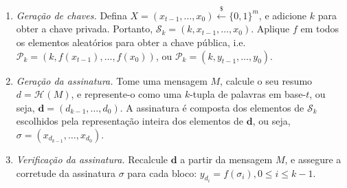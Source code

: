 \documentclass[12pt]{report}
\newcommand{\pk}{\mathcal{P}_k}
\newcommand{\sk}{\mathcal{S}_k}
\newcommand{\hash}[2][]{\mathcal{H}^{#1}(#2)}
\newcommand{\binwds}[1]{\{0, 1\}^{#1}}
\begin{document}
\begin{enumerate}

  \item[] \emph{Geração de chaves.} Defina $X = (x_{t - 1}, \dots, x_0)
      \stackrel{\$}{\longleftarrow} \binwds{m}$, e adicione $k$ para
      obter a chave privada. Portanto, $\sk{} = (k, x_{t - 1}, \dots, x_0)$.
      Aplique $f$ em todos os elementos aleatórios para obter a chave pública, i.e.
      $\pk{} = (k, f(x_{t - 1}), \dots, f(x_0))$, ou $\pk{} = (k, y_{t - 1}, \dots, y_0)$.

  \item[] \emph{Geração da assinatura.} Tome uma mensagem $M$, calcule o seu
    resumo $d = \hash{M}$, e represente-o como uma $k$-tupla de palavras em base-$t$,
    ou seja, $\mathbf{d} = (d_{k - 1}, \dots, d_0)$. A assinatura é composta dos elementos
    de $\sk{}$ escolhidos pela representação inteira dos elementos de $\mathbf{d}$,
    ou seja, $\sigma = (x_{d_{k - 1}}, \dots, x_{d_{0}})$.

  \item[] \emph{Verificação da assinatura.} Recalcule $\mathbf{d}$ a partir da mensagem $M$,
    e assegure a corretude da assinatura $\sigma$ para cada bloco: $y_{d_{i}} = f(\sigma_{i}), 0 \leq i \leq k - 1$.

\end{enumerate}
\end{document}
